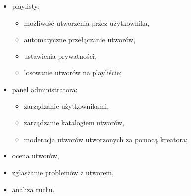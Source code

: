 \documentclass[11pt]{article}
\begin{document}
\begin{itemize}
    \item playlisty:
    \begin{itemize}
      \item możliwość utworzenia przez użytkownika,
      \item automatyczne przełączanie utworów,
      \item ustawienia prywatności,
      \item losowanie utworów na playliście;
    \end{itemize}
    \item panel administratora:
    \begin{itemize}
      \item zarządzanie użytkownikami,
      \item zarządzanie katalogiem utworów,
      \item moderacja utworów utworzonych za pomocą kreatora;
    \end{itemize}
    \item ocena utworów,
    \item zgłaszanie problemów z utworem,
    \item analiza ruchu.
  \end{itemize}
\end{document}
